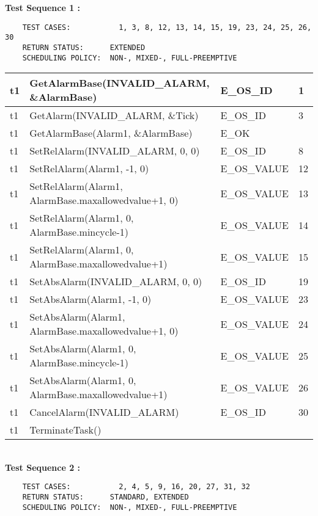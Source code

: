 \documentclass[10pt]{article}
\newlength{\Li}\settowidth{\Li}{Running}
\newlength{\Lii}\setlength{\Lii}{7cm}
\newlength{\Liiii}\setlength{\Liiii}{0.9cm}
\newlength{\Liii}\setlength{\Liii}{\textwidth} \addtolength{\Liii}{-\Li} \addtolength{\Liii}{-\Lii} \addtolength{\Liii}{-\Liiii}
\begin{document}
	\textbf{Test Sequence 1 :}
	\begin{lstlisting}
	TEST CASES:		      1, 3, 8, 12, 13, 14, 15, 19, 23, 24, 25, 26, 30
	RETURN STATUS:	    EXTENDED
	SCHEDULING POLICY:  NON-, MIXED-, FULL-PREEMPTIVE
	\end{lstlisting}
	
	
	\begin{supertabular}{|p{\Li}|p{\Lii}|p{\Liii}|p{\Liiii}|} \hline 
	t1	& GetAlarmBase(INVALID\_ALARM, \&AlarmBase)					& E\_OS\_ID		& 1 \\ \hline
	t1	& GetAlarm(INVALID\_ALARM, \&Tick) 							& E\_OS\_ID		& 3 \\ \hline
	t1	& GetAlarmBase(Alarm1, \&AlarmBase)					& E\_OK 			&\\ \hline
	t1	& SetRelAlarm(INVALID\_ALARM, 0, 0)							& E\_OS\_ID 		& 8 \\ \hline
	t1	& SetRelAlarm(Alarm1, -1, 0)							& E\_OS\_VALUE 	& 12 \\ \hline
	t1	& SetRelAlarm(Alarm1, AlarmBase.maxallowedvalue+1, 0)	& E\_OS\_VALUE	& 13 \\ \hline
	t1	& SetRelAlarm(Alarm1, 0, AlarmBase.mincycle-1)			& E\_OS\_VALUE	& 14 \\ \hline
	t1	& SetRelAlarm(Alarm1, 0, AlarmBase.maxallowedvalue+1)	& E\_OS\_VALUE 	& 15 \\ \hline
	t1	& SetAbsAlarm(INVALID\_ALARM, 0, 0)							& E\_OS\_ID 		& 19 \\ \hline
	t1	& SetAbsAlarm(Alarm1, -1, 0)							& E\_OS\_VALUE	& 23 \\ \hline
	t1	& SetAbsAlarm(Alarm1, AlarmBase.maxallowedvalue+1, 0)	& E\_OS\_VALUE 	& 24 \\ \hline
	t1	& SetAbsAlarm(Alarm1, 0, AlarmBase.mincycle-1) 			& E\_OS\_VALUE	& 25 \\ \hline
	t1	& SetAbsAlarm(Alarm1, 0, AlarmBase.maxallowedvalue+1)	& E\_OS\_VALUE	& 26 \\ \hline
	t1	& CancelAlarm(INVALID\_ALARM) 							&E\_OS\_ID		& 30 \\ \hline
	t1	& TerminateTask()									&				&\\ \hline
	\end{supertabular} \\

	\textbf{Test Sequence 2 :}
	\begin{lstlisting}
	TEST CASES:		      2, 4, 5, 9, 16, 20, 27, 31, 32
	RETURN STATUS:	    STANDARD, EXTENDED
	SCHEDULING POLICY:  NON-, MIXED-, FULL-PREEMPTIVE
	\end{lstlisting}
	
\end{document}
